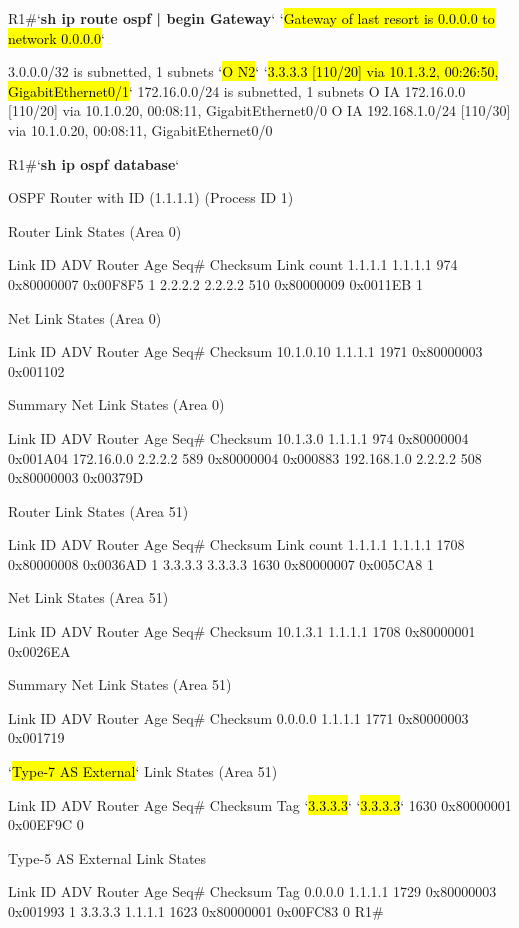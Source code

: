 \documentclass{EdipyLabs} %
\begin{document}
\begin{CommandBox}
R1#`\textbf{sh ip route ospf | begin Gateway}`
`\hl{Gateway of last resort is 0.0.0.0 to network 0.0.0.0}`

      3.0.0.0/32 is subnetted, 1 subnets
`\hl{O N2}`     `\hl{3.3.3.3 [110/20] via 10.1.3.2, 00:26:50, GigabitEthernet0/1}`
      172.16.0.0/24 is subnetted, 1 subnets
O IA     172.16.0.0 [110/20] via 10.1.0.20, 00:08:11, GigabitEthernet0/0
O IA  192.168.1.0/24 [110/30] via 10.1.0.20, 00:08:11, GigabitEthernet0/0
\end{CommandBox}

\begin{CommandBox}
R1#`\textbf{sh ip ospf database}`

            OSPF Router with ID (1.1.1.1) (Process ID 1)

                Router Link States (Area 0)

Link ID         ADV Router      Age         Seq#       Checksum Link count
1.1.1.1         1.1.1.1         974         0x80000007 0x00F8F5 1
2.2.2.2         2.2.2.2         510         0x80000009 0x0011EB 1

                Net Link States (Area 0)

Link ID         ADV Router      Age         Seq#       Checksum
10.1.0.10       1.1.1.1         1971        0x80000003 0x001102

                Summary Net Link States (Area 0)

Link ID         ADV Router      Age         Seq#       Checksum
10.1.3.0        1.1.1.1         974         0x80000004 0x001A04
172.16.0.0      2.2.2.2         589         0x80000004 0x000883
192.168.1.0     2.2.2.2         508         0x80000003 0x00379D

                Router Link States (Area 51)

Link ID         ADV Router      Age         Seq#       Checksum Link count
1.1.1.1         1.1.1.1         1708        0x80000008 0x0036AD 1
3.3.3.3         3.3.3.3         1630        0x80000007 0x005CA8 1

                Net Link States (Area 51)

Link ID         ADV Router      Age         Seq#       Checksum
10.1.3.1        1.1.1.1         1708        0x80000001 0x0026EA

                Summary Net Link States (Area 51)

Link ID         ADV Router      Age         Seq#       Checksum
0.0.0.0         1.1.1.1         1771        0x80000003 0x001719

                `\hl{Type-7 AS External}` Link States (Area 51)

Link ID         ADV Router      Age         Seq#       Checksum Tag
`\hl{3.3.3.3}`         `\hl{3.3.3.3}`         1630        0x80000001 0x00EF9C 0

                Type-5 AS External Link States

Link ID         ADV Router      Age         Seq#       Checksum Tag
0.0.0.0         1.1.1.1         1729        0x80000003 0x001993 1
3.3.3.3         1.1.1.1         1623        0x80000001 0x00FC83 0
R1#
\end{CommandBox}
\end{document}
